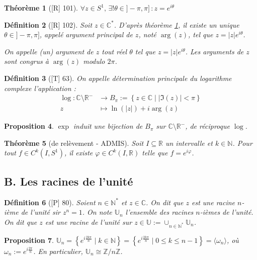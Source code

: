 \documentclass[10pt, a4paper, parskip=full, twoside, twocolumn]{report}
\newtheorem{definition}{Définition}
\newtheorem{theorem}[definition]{Théorème}
\newtheorem{proposition}[definition]{Proposition}
\newcommand{\IN}{\mathbb{N}}
\newcommand{\IU}{\mathbb{U}}
\newcommand{\IZnZ}{\mathbb{Z}/n\mathbb{Z}}
\newcommand{\IC}{\mathbb{C}}
\newcommand{\IR}{\mathbb{R}}
\begin{document}
\begin{theorem}[\textnormal{[R] 101}]\label{th:11}
	$\forall z\in S^1,\, \exists !\theta\in ]-\pi,\pi]\,\colon z = e^{i\theta}$
\end{theorem}

\begin{definition}[\textnormal{[R] 102}]
	Soit $z\in\IC^*$. D'après théorème \ref{th:11}, il existe un unique $\theta\in ]-\pi,\pi]$,
	appelé \emph{argument principal} de $z$, noté $\arg(z)$, tel que $z = \vert z \vert e^{i\theta}$.

	On appelle \emph{(un) argument} de $z$ tout réel $\theta$ tel que $z = \vert z \vert e^{i\theta}$. Les arguments de $z$ sont
	congrus à $\arg(z)$ modulo $2\pi$.
\end{definition}

\begin{definition}[\textnormal{[T] 63}]
	On appelle \emph{détermination principale du logarithme complexe} l'application :
	\begin{align*}
	\log : \IC\setminus \IR^- &\longrightarrow B_{\pi} := \left\{z\in\IC \mid |\Im(z)|<\pi\right\} \\
		z &\longmapsto \ln(|z|)+i\arg(z)
	\end{align*}
\end{definition}

\begin{proposition}
	$\exp$ induit une bijection de $B_{\pi}$ sur $\IC\setminus \IR^-$, de réciproque $\log$.
\end{proposition}

\begin{theorem}[de relèvement - ADMIS]
	Soit $I\subseteq \IR$ un intervalle et $k\in\IN$.
	Pour tout $f\in C^k(I,S^1)$, il existe $\varphi\in C^k(I,\IR)$ telle que $f = e^{i\varphi}$.
\end{theorem}

\subsection*{B. Les racines de l'unité}
\begin{definition}[\textnormal{[P] 80}]
	Soient $n\in\IN^*$ et $z\in\IC$.
	On dit que $z$ est une \emph{racine $n$-ième de l'unité} sir $z^n=1$. 
	On note $\IU_n$ l'ensemble des racines $n$-ièmes de l'unité.
	On dit que $z$ est une racine de l'unité sur $z\in \IU := \cup_{n\in\IN^*} \IU_n$.
\end{definition}

\begin{proposition}
	$\IU_n = \left\{e^{i\frac{2k\pi}{n}}\mid k\in \IN\right\} = \left\{e^{i\frac{2k\pi}{n}}\mid 0\leq k \leq n-1\right\} = \langle \omega_n \rangle$, 
	où $\omega_n := e^{i\frac{2\pi}{n}}$. En particulier, $\IU_n\cong \IZnZ$.
\end{proposition}
\end{document}
